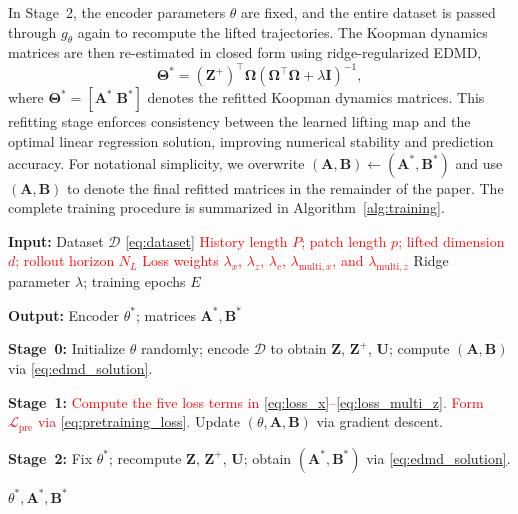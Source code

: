 \documentclass[journal]{IEEEtran}
\newcommand{\mA}{\mathbf{A}}
\newcommand{\mB}{\mathbf{B}}
\newcommand{\mZ}{\mathbf{Z}}
\newcommand{\mU}{\mathbf{U}}
\newcommand{\mI}{\mathbf{I}}
\newcommand{\mTheta}{\boldsymbol{\Theta}}
\newcommand{\mOmega}{\boldsymbol{\Omega}}
\begin{document}
In Stage~2, the encoder parameters $\theta$ are fixed, and the entire dataset is passed through $g_\theta$ again to recompute the lifted trajectories. The Koopman dynamics matrices are then re-estimated in closed form using ridge-regularized EDMD,
\begin{equation}
    \mTheta^{*} = (\mZ^{+})^\top \mOmega
    \left(\mOmega^\top \mOmega + \lambda \mI\right)^{-1},
\end{equation}
where $\mTheta^{*} = [\mA^{*}\;\mB^{*}]$ denotes the refitted Koopman dynamics matrices. This refitting stage enforces consistency between the learned lifting map and the optimal linear regression solution, improving numerical stability and prediction accuracy. For notational simplicity, we overwrite
$(\mA,\mB)\leftarrow(\mA^{*},\mB^{*})$ and use $(\mA,\mB)$ to denote the final refitted matrices in the remainder of the paper.
The complete training procedure is summarized in Algorithm~\ref{alg:training}.

\begin{algorithm}[!t]
\caption{Transformer-Koopman Training Algorithm}
\label{alg:training}
\begin{algorithmic}[1]

\STATE \textbf{Input:} Dataset $\mathcal{D}$ \eqref{eq:dataset}
\STATE \textcolor{red}{History length $P$; patch length $p$; lifted dimension $d$; rollout horizon $N_L$}
\STATE \textcolor{red}{Loss weights $\lambda_x$, $\lambda_z$, $\lambda_c$, $\lambda_{\mathrm{multi},x}$, and $\lambda_{\mathrm{multi},z}$}
\STATE Ridge parameter $\lambda$; training epochs $E$

\STATE \textbf{Output:} Encoder $\theta^{*}$; matrices $\mA^{*}, \mB^{*}$

\STATE \textbf{Stage~0:}
Initialize $\theta$ randomly; encode $\mathcal{D}$ to obtain
$\mZ$, $\mZ^{+}$, $\mU$; compute $(\mA,\mB)$ via
\eqref{eq:edmd_solution}.

\vspace{2pt}

\STATE \textbf{Stage~1:}
        \STATE \textcolor{red}{Compute the five loss terms in
        \eqref{eq:loss_x}--\eqref{eq:loss_multi_z}.}
        \STATE \textcolor{red}{Form $\mathcal{L}_{\mathrm{pre}}$
        via \eqref{eq:pretraining_loss}.}
        \STATE Update $(\theta, \mA, \mB)$ via gradient descent.
    \ENDFOR
\ENDFOR

\vspace{2pt}

\STATE \textbf{Stage~2:}
Fix $\theta^{*}$; recompute $\mZ$, $\mZ^{+}$, $\mU$;
obtain $(\mA^{*}, \mB^{*})$ via \eqref{eq:edmd_solution}.

\RETURN $\theta^{*}, \mA^{*}, \mB^{*}$

\end{algorithmic}
\end{algorithm}
\end{document}
